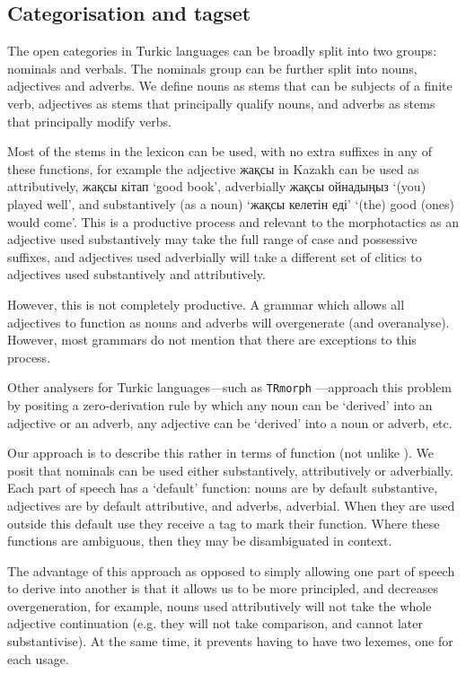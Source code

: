 \documentclass[a4paper,11pt,twocolumn]{article}
\begin{document}
\subsection{Categorisation and tagset}

The open categories in Turkic languages can be broadly split into two groups: nominals
and verbals. The nominals group can be further split into nouns, adjectives and adverbs.
We define nouns as stems that can be subjects of a finite verb, adjectives as stems that principally qualify 
nouns, and adverbs as stems that principally modify verbs.

Most of the stems in the lexicon can be used, with no extra suffixes in any of these functions, for 
example the adjective жақсы in Kazakh can be used as attributively, жақсы кітап `good book', adverbially
жақсы ойнадыңыз `(you) played well', and substantively (as a noun) `жақсы келетін еді' `(the) good (ones) would come'. This
is a productive process and relevant to the morphotactics as an adjective used substantively may take the 
full range of case and possessive suffixes, and adjectives used adverbially will take a different set of 
clitics to adjectives used substantively and attributively. 

However, this is not completely productive. A grammar which allows all adjectives to function
as nouns and adverbs will overgenerate (and overanalyse). However, most grammars do not 
mention that there are exceptions to this process.

Other analysers for Turkic languages---such as \texttt{TRmorph} \citep{coltekin2010}---approach this 
problem by positing a zero-derivation rule by which any noun can be `derived' into an adjective or 
an adverb, any adjective can be `derived' into a noun or adverb, etc. 

Our approach is to describe this rather in terms of function (not unlike \cite{hengeveld92}). We 
posit that nominals can be used either substantively, attributively or adverbially. Each part of speech 
has a `default' function: nouns are by default substantive, adjectives are by default attributive, 
and adverbs, adverbial. When they are used outside this default use they receive a tag to mark 
their function. Where these functions are ambiguous, then they may be disambiguated 
in context. 

The advantage of this approach as opposed to simply allowing one part of speech to derive into
another is that it allows us to be more principled, and decreases overgeneration,
for example, nouns used attributively will not take the whole adjective continuation (e.g.
they will not take comparison, and cannot later substantivise). At the same time, it prevents 
having to have two lexemes, one for each usage.
\end{document}
